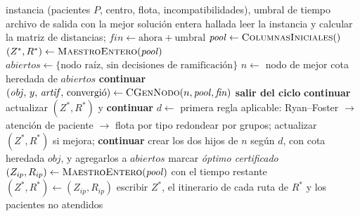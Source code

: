\documentclass[12pt]{article}
\numberwithin{algorithm}{section}
\begin{document}
\begin{algorithm}[H]
\caption{\textsc{SaludChallenger} --- esquema principal de Branch \& Price}
\label{alg:bp}
\begin{algorithmic}[1]
\Require instancia (pacientes $P$, centro, flota, incompatibilidades), umbral de tiempo
\Ensure archivo de salida con la mejor solución entera hallada
\State leer la instancia y calcular la matriz de distancias; $\mathit{fin} \gets \text{ahora} + \text{umbral}$
\State $\mathit{pool} \gets \Call{ColumnasIniciales}{ }$ 
\State $(Z^*, R^*) \gets \Call{MaestroEntero}{\mathit{pool}}$ 
\State $\mathit{abiertos} \gets \{\text{nodo raíz, sin decisiones de ramificación}\}$
    \State $n \gets$ nodo de mejor cota heredada de $\mathit{abiertos}$ 
     \textbf{continuar} 
    \EndIf
    \State $(\mathit{obj},\, y,\, \mathit{artif},\, \text{convergió}) \gets \Call{CGenNodo}{n, \mathit{pool}, \mathit{fin}}$ 
     \textbf{salir del ciclo} 
    \EndIf
     \textbf{continuar} 
    \EndIf
     actualizar $(Z^*, R^*)$ y \textbf{continuar}
    \EndIf
    \State $d \gets$ primera regla aplicable: Ryan--Foster $\to$ atención de paciente $\to$ flota por tipo
     
        \State redondear por grupos; actualizar $(Z^*, R^*)$ si mejora; \textbf{continuar}
    \EndIf
    \State crear los dos hijos de $n$ según $d$, con cota heredada $\mathit{obj}$, y agregarlos a $\mathit{abiertos}$
\EndWhile
{} marcar \emph{óptimo certificado}
\EndIf
\State $(Z_{ip}, R_{ip}) \gets \Call{MaestroEntero}{\mathit{pool}}$ con el tiempo restante 
 $(Z^*, R^*) \gets (Z_{ip}, R_{ip})$
\EndIf
\State escribir $Z^*$, el itinerario de cada ruta de $R^*$ y los pacientes no atendidos
\end{algorithmic}
\end{algorithm}
\end{document}
